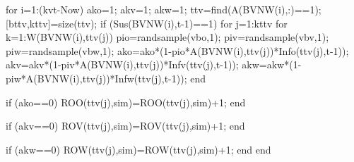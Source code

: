                                     for i=1:(kvt-Now)
                                          ako=1;
                                          akv=1;
                                          akw=1;
                                          ttv=find(A(BVNW(i),:)==1);    
                                          [bttv,kttv]=size(ttv);
                                          if (Sus(BVNW(i),t-1)==1)
                                                    for j=1:kttv                                                                                                  
                                                          for k=1:W(BVNW(i),ttv(j))                                             
                                                                pio=randsample(vbo,1);
                                                                piv=randsample(vbv,1);
                                                                piw=randsample(vbw,1);
                                                                ako=ako*(1-pio*A(BVNW(i),ttv(j))*Info(ttv(j),t-1));
                                                                akv=akv*(1-piv*A(BVNW(i),ttv(j))*Infv(ttv(j),t-1));
                                                                akw=akw*(1-piw*A(BVNW(i),ttv(j))*Infw(ttv(j),t-1));                                                                 
                                                          end
                                                          
                                                          if (ako==0)
                                                             ROO(ttv(j),sim)=ROO(ttv(j),sim)+1;
                                                          end
                                                          
                                                          if (akv==0)
                                                             ROV(ttv(j),sim)=ROV(ttv(j),sim)+1;
                                                          end
                                                          
                                                          if (akw==0)
                                                             ROW(ttv(j),sim)=ROW(ttv(j),sim)+1;
                                                          end
                                                    end
                                                     
